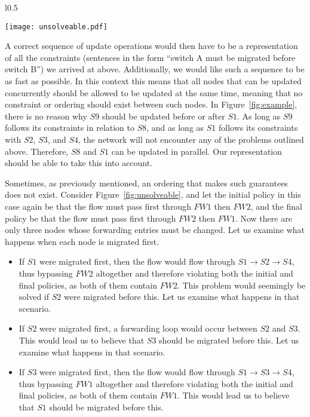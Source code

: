 \documentclass[pageno]{jpaper}
\begin{document}
\begin{wrapfigure}{l}{0.5\textwidth}
    \vspace{-10pt}
    \caption{\label{fig:unsolveable}}
    \texttt{[image: unsolveable.pdf]}
    \vspace{-10pt}
\end{wrapfigure}

A correct sequence of update operations would then have to be a representation of all the constraints (sentences in the form ``switch A must be migrated before switch B'') we arrived at above. Additionally, we would like such a sequence to be as fast as possible. In this context this means that all nodes that can be updated concurrently should be allowed to be updated at the same time, meaning that no constraint or ordering should exist between such nodes. In Figure~\ref{fig:example}, there is no reason why $S9$ should be updated before or after $S1$. As long as $S9$ follows its constraints in relation to $S8$, and as long as $S1$ follows its constraints with $S2$, $S3$, and $S4$, the network will not encounter any of the problems outlined above. Therefore, $S8$ and $S1$ can be updated in parallel. Our representation should be able to take this into account.

Sometimes, as previously mentioned, an ordering that makes such guarantees does not exist. Consider Figure~\ref{fig:unsolveable}, and let the initial policy in this case again be that the flow must pass first through $FW1$ then $FW2$, and the final policy be that the flow must pass first through $FW2$ then $FW1$. Now there are only three nodes whose forwarding entries must be changed. Let us examine what happens when each node is migrated first.

\begin{itemize}
\item If $S1$ were migrated first, then the flow would flow through $S1 \rightarrow S2 \rightarrow S4$, thus bypassing $FW2$ altogether and therefore violating both the initial and final policies, as both of them contain $FW2$. This problem would seemingly be solved if $S2$ were migrated before this. Let us examine what happens in that scenario.
\item If $S2$ were migrated first, a forwarding loop would occur between $S2$ and $S3$. This would lead us to believe that $S3$ should be migrated before this. Let us examine what happens in that scenario.
\item If $S3$ were migrated first, then the flow would flow through $S1 \rightarrow S3 \rightarrow S4$, thus bypassing $FW1$ altogether and therefore violating both the initial and final policies, as both of them contain $FW1$. This would lead us to believe that $S1$ should be migrated before this.
\end{itemize}
\end{document}
